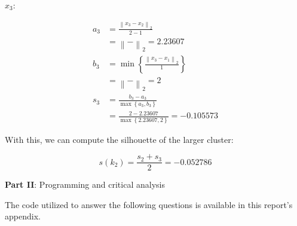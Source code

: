 \documentclass[12pt]{article}
\begin{document}
\begin{enumerate}[leftmargin=\labelsep]
\begin{enumerate}[leftmargin=\labelsep]
\begin{paracol}{2}
                  \switchcolumn

                  $x_3$:

                  \begin{equation*}
                    \begin{aligned}
                      a_3 & = \frac{\left\| x_3 - x_2 \right\|_2}{2 - 1}                             \\
                          & = \left\|  -  \right\|_2
                      = 2.23607                                                                      \\
                      b_3 & = \min\left\{\frac{\left\| x_3 - x_1 \right\|_2}{1}\right\}              \\
                          & = \left\|  -  \right\|_2
                      = 2                                                                            \\
                      s_3 & = \frac{b_3 - a_3}{\max\left\{a_3, b_3\right\}}                          \\
                          & = \frac{2 - 2.23607}{\max\left\{2.23607, 2\right\}} = -0.105573
                    \end{aligned}
                  \end{equation*}

                \end{paracol}

                \vspace*{0.5cm}

                With this, we can compute the silhouette of the larger cluster:

                \begin{equation*}
                  s(k_2) = \frac{s_2 + s_3}{2} = -0.052786
                \end{equation*}


        \end{enumerate}

\end{enumerate}

\pagebreak

\center\large{\textbf{Part II}: Programming and critical analysis}

\begin{justify}
  The code utilized to answer the following questions is available in this
  report's appendix.
\end{justify}
\end{document}
